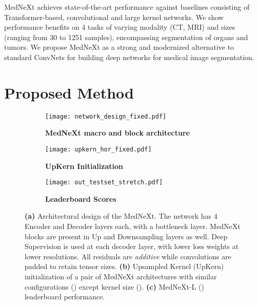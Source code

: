 \documentclass[runningheads]{llncs}
\begin{document}
MedNeXt achieves state-of-the-art performance against baselines consisting of Transformer-based, convolutional and large kernel networks. We show performance benefits on 4 tasks of varying modality (CT, MRI) and sizes (ranging from 30 to 1251 samples), encompassing segmentation of organs and tumors. We propose MedNeXt as a strong and modernized alternative to standard ConvNets for building deep networks for medical image segmentation.

\section{Proposed Method}

\begin{figure}[t]
    \centering
    \begin{subfigure}[b]{\textwidth}
    \texttt{[image: network\_design\_fixed.pdf]}
    \caption{\textbf{MedNeXt macro and block architecture}}
    \label{fig:network_design}
    \end{subfigure}
\begin{subfigure}[b]{0.55\textwidth}
    \centering
    \texttt{[image: upkern\_hor\_fixed.pdf]}
    \caption{\textbf{UpKern Initialization}}
    \label{fig:upkern}
    \end{subfigure}
    \begin{subfigure}[b]{0.44\textwidth}
    \centering
    \texttt{[image: out\_testset\_stretch.pdf]}
    \caption{\textbf{Leaderboard Scores}}
    \label{fig:testset_scores}
    \end{subfigure}
    \caption{\textbf{(a)} Architectural design of the MedNeXt. The network has 4 Encoder and Decoder layers each, with a bottleneck layer. MedNeXt blocks are present in Up and Downsampling layers as well. Deep Supervision is used at each decoder layer, with lower loss weights at lower resolutions. All residuals are \textit{additive} while convolutions are padded to retain tensor sizes. \textbf{(b)} Upsampled Kernel (UpKern) initialization of a pair of MedNeXt architectures with similar configurations () except kernel size (). \textbf{(c)} MedNeXt-L () leaderboard performance.
    }
    
\end{figure}
\end{document}
